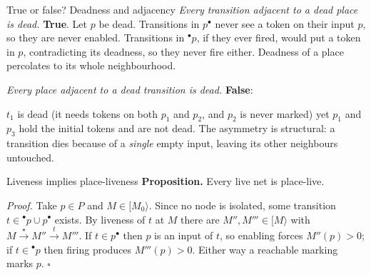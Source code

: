 \begin{examplebox}{True or false? Deadness and adjacency}
\emph{Every transition adjacent to a dead place is dead.} \textbf{True}. Let $p$ be dead. Transitions in $p^\bullet$ never see a token on their input $p$, so they are never enabled. Transitions in ${}^\bullet p$, if they ever fired, would put a token in $p$, contradicting its deadness, so they never fire either. Deadness of a place percolates to its whole neighbourhood.
\par\smallskip
\emph{Every place adjacent to a dead transition is dead.} \textbf{False}:
\begin{center}
\end{center}
$t_1$ is dead (it needs tokens on both $p_1$ and $p_2$, and $p_2$ is never marked) yet $p_1$ and $p_3$ hold the initial tokens and are not dead. The asymmetry is structural: a transition dies because of a \emph{single} empty input, leaving its other neighbours untouched.
\end{examplebox}

\begin{definitionbox}{Liveness implies place-liveness}
\textbf{Proposition.} Every live net is place-live.
\par\smallskip
\textit{Proof.} Take $p \in P$ and $M \in [M_0\rangle$. Since no node is isolated, some transition $t \in {}^\bullet p \cup p^\bullet$ exists. By liveness of $t$ at $M$ there are $M'', M''' \in [M\rangle$ with $M \xrightarrow{\star} M'' \xrightarrow{t} M'''$. If $t \in p^\bullet$ then $p$ is an input of $t$, so enabling forces $M''(p) > 0$; if $t \in {}^\bullet p$ then firing produces $M'''(p) > 0$. Either way a reachable marking marks $p$. \hfill$\square$
\end{definitionbox}

